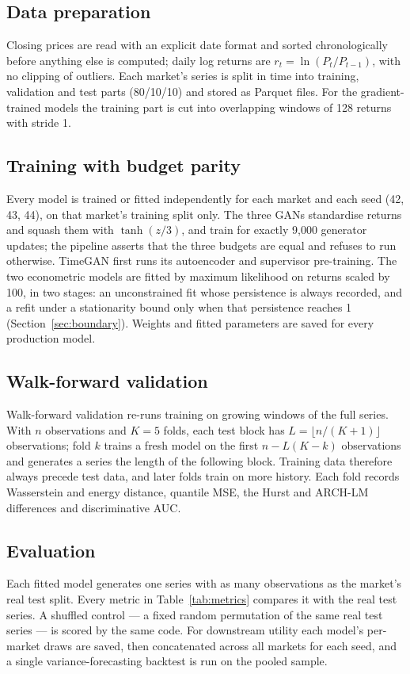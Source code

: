 \documentclass[11pt,a4paper]{article}
\makeatletter
\DeclareRobustCommand{\_}{\ifmmode\nfss@text{\textunderscore}\else\textunderscore\allowbreak\fi}
\makeatother
\begin{document}
\subsection{Data preparation}
Closing prices are read with an explicit date format and sorted chronologically before anything else is computed; daily log returns are $r_t=\ln(P_t/P_{t-1})$, with no clipping of outliers. Each market's series is split in time into training, validation and test parts (80/10/10) and stored as Parquet files. For the gradient-trained models the training part is cut into overlapping windows of 128 returns with stride 1.

\subsection{Training with budget parity}
Every model is trained or fitted independently for each market and each seed (42, 43, 44), on that market's training split only. The three GANs standardise returns and squash them with $\tanh(z/3)$, and train for exactly 9,000 generator updates; the pipeline asserts that the three budgets are equal and refuses to run otherwise. TimeGAN first runs its autoencoder and supervisor pre-training. The two econometric models are fitted by maximum likelihood on returns scaled by 100, in two stages: an unconstrained fit whose persistence is always recorded, and a refit under a stationarity bound only when that persistence reaches 1 (Section~\ref{sec:boundary}). Weights and fitted parameters are saved for every production model.

\subsection{Walk-forward validation}
Walk-forward validation re-runs training on growing windows of the full series. With $n$ observations and $K=5$ folds, each test block has $L=\lfloor n/(K+1)\rfloor$ observations; fold $k$ trains a fresh model on the first $n-L(K-k)$ observations and generates a series the length of the following block. Training data therefore always precede test data, and later folds train on more history. Each fold records Wasserstein and energy distance, quantile MSE, the Hurst and ARCH-LM differences and discriminative AUC.

\subsection{Evaluation}
Each fitted model generates one series with as many observations as the market's real test split. Every metric in Table~\ref{tab:metrics} compares it with the real test series. A shuffled control --- a fixed random permutation of the same real test series --- is scored by the same code. For downstream utility each model's per-market draws are saved, then concatenated across all markets for each seed, and a single variance-forecasting backtest is run on the pooled sample.
\end{document}
